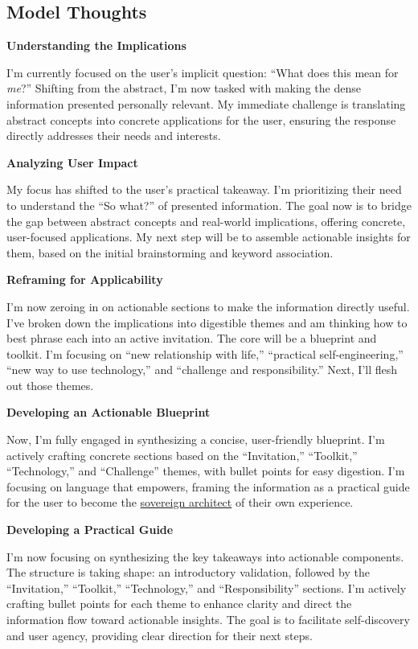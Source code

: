 \documentclass{article}
\begin{document}
\subsection*{Model Thoughts}\label{model-thoughts}

\textbf{Understanding the Implications}

I'm currently focused on the user's implicit question: ``What does this mean for \emph{me}?'' Shifting from the abstract, I'm now tasked with making the dense information presented personally relevant. My immediate challenge is translating abstract concepts into concrete applications for the user, ensuring the response directly addresses their needs and interests.

\textbf{Analyzing User Impact}

My focus has shifted to the user's practical takeaway. I'm prioritizing their need to understand the ``So what?'' of presented information. The goal now is to bridge the gap between abstract concepts and real-world implications, offering concrete, user-focused applications. My next step will be to assemble actionable insights for them, based on the initial brainstorming and keyword association.

\textbf{Reframing for Applicability}

I'm now zeroing in on actionable sections to make the information directly useful. I've broken down the implications into digestible themes and am thinking how to best phrase each into an active invitation. The core will be a blueprint and toolkit. I'm focusing on ``new relationship with life,'' ``practical self-engineering,'' ``new way to use technology,'' and ``challenge and responsibility.'' Next, I'll flesh out those themes.

\textbf{Developing an Actionable Blueprint}

Now, I'm fully engaged in synthesizing a concise, user-friendly blueprint. I'm actively crafting concrete sections based on the ``Invitation,'' ``Toolkit,'' ``Technology,'' and ``Challenge'' themes, with bullet points for easy digestion. I'm focusing on language that empowers, framing the information as a practical guide for the user to become the \hyperlink{gloss:sovereign_architect}{sovereign architect} of their own experience.

\textbf{Developing a Practical Guide}

I'm now focusing on synthesizing the key takeaways into actionable components. The structure is taking shape: an introductory validation, followed by the ``Invitation,'' ``Toolkit,'' ``Technology,'' and ``Responsibility'' sections. I'm actively crafting bullet points for each theme to enhance clarity and direct the information flow toward actionable insights. The goal is to facilitate self-discovery and user agency, providing clear direction for their next steps.
\end{document}

